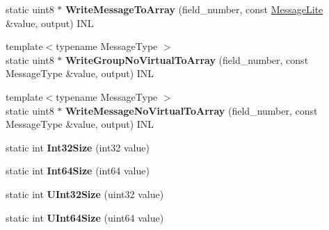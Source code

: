 \begin{DoxyCompactItemize}
\mbox{\label{classgoogle_1_1protobuf_1_1internal_1_1WireFormatLite_a0ab726057747951f25f2649b45109614}} 
static uint8 $\ast$ {\bfseries Write\+Message\+To\+Array} (field\+\_\+number, const \hyperlink{classgoogle_1_1protobuf_1_1MessageLite}{Message\+Lite} \&value, output) I\+NL
\item 
\mbox{\label{classgoogle_1_1protobuf_1_1internal_1_1WireFormatLite_ad20f8e1badac0efeea423aacd01e6403}} 
{\footnotesize template$<$typename Message\+Type $>$ }\\static uint8 $\ast$ {\bfseries Write\+Group\+No\+Virtual\+To\+Array} (field\+\_\+number, const Message\+Type \&value, output) I\+NL
\item 
\mbox{\label{classgoogle_1_1protobuf_1_1internal_1_1WireFormatLite_adb2e10be9f3e6c8ddb58e452a9b5e489}} 
{\footnotesize template$<$typename Message\+Type $>$ }\\static uint8 $\ast$ {\bfseries Write\+Message\+No\+Virtual\+To\+Array} (field\+\_\+number, const Message\+Type \&value, output) I\+NL
\item 
\mbox{\label{classgoogle_1_1protobuf_1_1internal_1_1WireFormatLite_a32262e4712a2dd60b25f509bb6a7d964}} 
static int {\bfseries Int32\+Size} (int32 value)
\item 
\mbox{\label{classgoogle_1_1protobuf_1_1internal_1_1WireFormatLite_a9a012e746eb64088ed8df1e8c957dad0}} 
static int {\bfseries Int64\+Size} (int64 value)
\item 
\mbox{\label{classgoogle_1_1protobuf_1_1internal_1_1WireFormatLite_a8056f64245334b3f1ce64edd0de324c2}} 
static int {\bfseries U\+Int32\+Size} (uint32 value)
\item 
\mbox{\label{classgoogle_1_1protobuf_1_1internal_1_1WireFormatLite_ace5cd3f68f288a97a1ceee86901c716a}} 
static int {\bfseries U\+Int64\+Size} (uint64 value)
\item 
\mbox{\label{classgoogle_1_1protobuf_1_1internal_1_1WireFormatLite_a6791bd6e2ddd05b3f5272701ae9548d1}} 

\end{DoxyCompactItemize}
